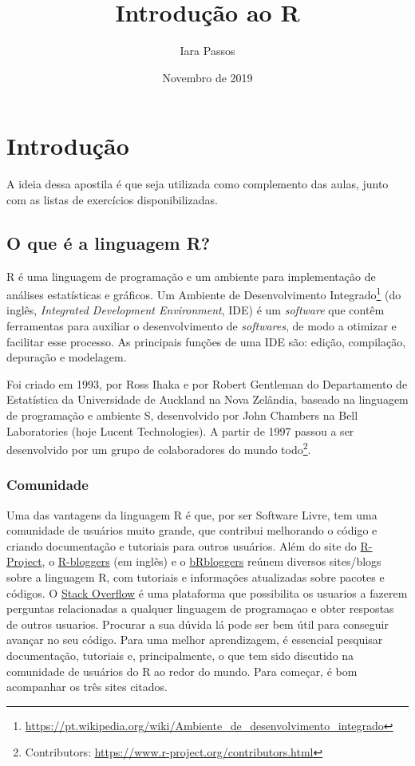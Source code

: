 \documentclass[]{book}
\title{Introdução ao R}
\author{Iara Passos}
\date{Novembro de 2019}
\let\rmarkdownfootnote\footnote%
\def\footnote{\protect\rmarkdownfootnote}
\theoremstyle{definition}
\theoremstyle{definition}
\theoremstyle{definition}
\theoremstyle{remark}
\begin{document}
\maketitle

{
\setcounter{tocdepth}{1}
\tableofcontents
}
\hypertarget{intro}{%
\chapter{Introdução}\label{intro}}

A ideia dessa apostila é que seja utilizada como complemento das aulas, junto com as listas de exercícios disponibilizadas.

\hypertarget{o-que-uxe9-a-linguagem-r}{%
\section{O que é a linguagem R?}\label{o-que-uxe9-a-linguagem-r}}

R é uma linguagem de programação e um ambiente para implementação de análises estatísticas e gráficos. Um Ambiente de Desenvolvimento Integrado\footnote{\url{https://pt.wikipedia.org/wiki/Ambiente_de_desenvolvimento_integrado}} (do inglês, \emph{Integrated Development Environment}, IDE) é um \emph{software} que contêm ferramentas para auxiliar o desenvolvimento de \emph{softwares}, de modo a otimizar e facilitar esse processo. As principais funções de uma IDE são: edição, compilação, depuração e modelagem.

Foi criado em 1993, por Ross Ihaka e por Robert Gentleman do Departamento de Estatística da Universidade de Auckland na Nova Zelândia, baseado na linguagem de programação e ambiente S, desenvolvido por John Chambers na Bell Laboratories (hoje Lucent Technologies). A partir de 1997 passou a ser desenvolvido por um grupo de colaboradores do mundo todo\footnote{Contributors: \url{https://www.r-project.org/contributors.html}}.

\hypertarget{comunidade}{%
\subsection{Comunidade}\label{comunidade}}

Uma das vantagens da linguagem R é que, por ser Software Livre, tem uma comunidade de usuários muito grande, que contribui melhorando o código e criando documentação e tutoriais para outros usuários. Além do site do \href{https://www.r-project.org/}{R-Project}, o \href{https://www.r-bloggers.com/}{R-bloggers} (em inglês) e o \href{https://brbloggers.com.br/}{bRbloggers} reúnem diversos sites/blogs sobre a linguagem R, com tutoriais e informações atualizadas sobre pacotes e códigos. O \href{https://stackoverflow.com/questions/tagged/r}{Stack Overflow} é uma plataforma que possibilita os usuarios a fazerem perguntas relacionadas a qualquer linguagem de programaçao e obter respostas de outros usuarios. Procurar a sua dúvida lá pode ser bem útil para conseguir avançar no seu código. Para uma melhor aprendizagem, é essencial pesquisar documentação, tutoriais e, principalmente, o que tem sido discutido na comunidade de usuários do R ao redor do mundo. Para começar, é bom acompanhar os três sites citados.
\end{document}
